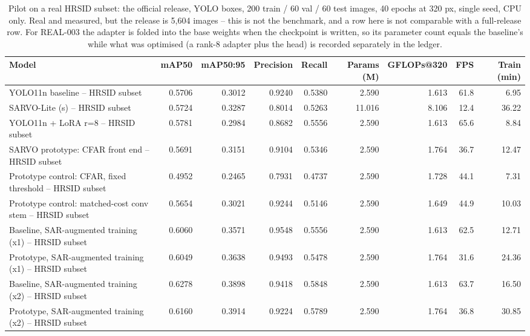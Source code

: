 \begin{table}[t]
\centering
\caption{Pilot on a real HRSID subset: the official release, YOLO boxes, 200 train / 60 val / 60 test images, 40 epochs at 320 px, single seed, CPU only. Real and measured, but the release is 5,604 images -- this is not the benchmark, and a row here is not comparable with a full-release row. For REAL-003 the adapter is folded into the base weights when the checkpoint is written, so its parameter count equals the baseline's while what was optimised (a rank-8 adapter plus the head) is recorded separately in the ledger.}
\label{tab:real_data_pilot}
\begin{tabular}{lrrrrrrrr}
\toprule
Model & mAP50 & mAP50:95 & Precision & Recall & Params (M) & GFLOPs@320 & FPS & Train (min) \\
\midrule
YOLO11n baseline -- HRSID subset & 0.5706 & 0.3012 & 0.9240 & 0.5380 & 2.590 & 1.613 & 61.8 & 6.95 \\
SARVO-Lite (s) -- HRSID subset & 0.5724 & 0.3287 & 0.8014 & 0.5263 & 11.016 & 8.106 & 12.4 & 36.22 \\
YOLO11n + LoRA r=8 -- HRSID subset & 0.5781 & 0.2984 & 0.8682 & 0.5556 & 2.590 & 1.613 & 65.6 & 8.84 \\
SARVO prototype: CFAR front end -- HRSID subset & 0.5691 & 0.3151 & 0.9104 & 0.5346 & 2.590 & 1.764 & 36.7 & 12.47 \\
Prototype control: CFAR, fixed threshold -- HRSID subset & 0.4952 & 0.2465 & 0.7931 & 0.4737 & 2.590 & 1.728 & 44.1 & 7.31 \\
Prototype control: matched-cost conv stem -- HRSID subset & 0.5654 & 0.3021 & 0.9244 & 0.5146 & 2.590 & 1.649 & 44.9 & 10.03 \\
Baseline, SAR-augmented training (x1) -- HRSID subset & 0.6060 & 0.3571 & 0.9548 & 0.5556 & 2.590 & 1.613 & 62.5 & 12.71 \\
Prototype, SAR-augmented training (x1) -- HRSID subset & 0.6049 & 0.3638 & 0.9493 & 0.5478 & 2.590 & 1.764 & 31.6 & 24.36 \\
Baseline, SAR-augmented training (x2) -- HRSID subset & 0.6278 & 0.3898 & 0.9418 & 0.5848 & 2.590 & 1.613 & 63.7 & 16.50 \\
Prototype, SAR-augmented training (x2) -- HRSID subset & 0.6160 & 0.3914 & 0.9224 & 0.5789 & 2.590 & 1.764 & 36.8 & 30.85 \\
\bottomrule
\end{tabular}
\end{table}
